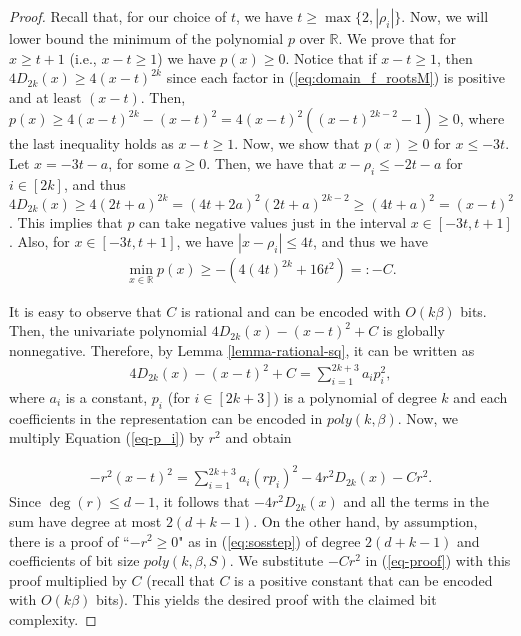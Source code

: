 \documentclass[11pt]{article}
\newcommand{\1}{\textbf{1}}
\begin{document}
\begin{proof}
Recall that, for  our choice of $t$,  we have $t\geq \max\{2,|\rho_i|\}$. Now, we will lower bound the minimum of the polynomial $p$ over $\mathbb{R}$. We prove that for $x\geq t +1$ (i.e., $x-t \geq 1$) we have $p(x) \geq 0$. Notice that if $x-t \geq 1$, then $4D_{2k}(x) \geq 4(x-t)^{2k}$ since each factor in (\ref{eq:domain_f_rootsM}) is positive and at least $(x-t)$. Then, $p(x)\geq 4(x-t)^{2k}-(x-t)^2 = 4(x-t)^2((x-t)^{2k-2}-1)\geq 0$, where the last inequality holds as $x-t \geq 1$. Now, we show that $p(x)\geq 0$ for $x\leq -3t$. Let $x=-3t-a$, for some $a\geq 0$. Then, we have that $x-\rho_i\leq-2t-a$ for $i\in [2k]$, and thus $4D_{2k}(x)\geq 4(2t+a)^{2k} = (4t+2a)^2(2t+a)^{2k-2}\geq (4t+a)^2 = (x-t)^2$. This implies that $p$ can take negative values just in the interval $x\in [-3t, t+1]$. Also, for $x\in [-3t, t+1]$, we have $|x-\rho_i|\leq 4t$, and thus we have
\begin{align} 
\min_{x\in \mathbb{R}} p(x) \geq - (4(4t)^{2k} + 16t^2)=:-C.
\end{align}

It is easy to observe that $C$ is rational and can be encoded with $O(k\beta)$ bits. Then, the univariate polynomial $4D_{2k}(x) - (x-t)^2 + C$ is globally nonnegative. Therefore, by Lemma \ref{lemma-rational-sq}, it can be written as 
\begin{align}\label{eq-p_i}
    4D_{2k}(x) - (x-t)^2 + C = \sum_{i=1}^{2k+3}a_ip_i^2,
\end{align}
where $a_i$ is a constant, $p_i$ (for $i\in [2k+3])$ is a polynomial of degree $k$ and each coefficients in the representation can be encoded in $poly(k,\beta)$. Now, we multiply Equation (\ref{eq-p_i}) by $r^2$ and obtain 

\begin{align}\label{eq-proof}
    - r^2(x-t)^2 = \sum_{i=1}^{2k+3}a_i(rp_i)^2 -  4r^2 D_{2k}(x) -Cr^2.
\end{align}
Since $\deg(r) \leq d-1$, it follows that $-4r^2 D_{2k}(x)$ and all the terms in the sum have degree at most $2(d+k-1)$. On the other hand, by assumption, there is a proof of ``$-r^2\geq 0$" as in (\ref{eq:sosstep}) of degree $2(d+k-1)$ and coefficients of bit size $poly(k,\beta,S)$.  We substitute $-Cr^2$ in (\ref{eq-proof}) with this proof multiplied by $C$ (recall that $C$ is a positive constant that can be encoded with $O(k\beta)$ bits). This yields the desired proof with the claimed bit complexity.
\end{proof}
\end{document}
